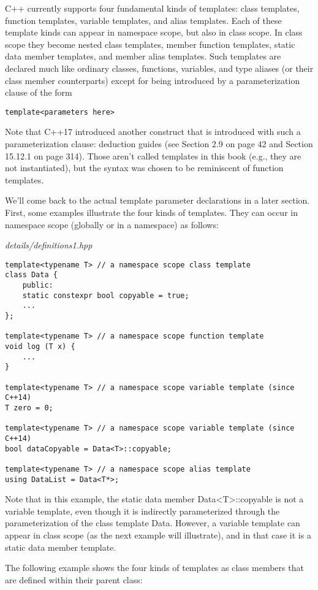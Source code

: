 
C++ currently supports four fundamental kinds of templates: class templates, function templates, variable templates, and alias templates. Each of these template kinds can appear in namespace scope, but also in class scope. In class scope they become nested class templates, member function templates, static data member templates, and member alias templates. Such templates are declared much like ordinary classes, functions, variables, and type aliases (or their class member counterparts) except for being introduced by a parameterization clause of the form

\begin{lstlisting}[style=styleCXX]
template<parameters here>
\end{lstlisting}

Note that C++17 introduced another construct that is introduced with such a parameterization clause: deduction guides (see Section 2.9 on page 42 and Section 15.12.1 on page 314). Those aren’t called templates in this book (e.g., they are not instantiated), but the syntax was chosen to be reminiscent of function templates.

We’ll come back to the actual template parameter declarations in a later section. First, some examples illustrate the four kinds of templates. They can occur in namespace scope (globally or in a namespace) as follows:

\noindent
\textit{details/definitions1.hpp}
\begin{lstlisting}[style=styleCXX]
template<typename T> // a namespace scope class template
class Data {
	public:
	static constexpr bool copyable = true;
	...
};

template<typename T> // a namespace scope function template
void log (T x) {
	...
}

template<typename T> // a namespace scope variable template (since C++14)
T zero = 0;

template<typename T> // a namespace scope variable template (since C++14)
bool dataCopyable = Data<T>::copyable;

template<typename T> // a namespace scope alias template
using DataList = Data<T*>;
\end{lstlisting}

Note that in this example, the static data member Data<T>::copyable is not a variable template, even though it is indirectly parameterized through the parameterization of the class template Data. However, a variable template can appear in class scope (as the next example will illustrate), and in that case it is a static data member template.

The following example shows the four kinds of templates as class members that are defined within their parent class:




